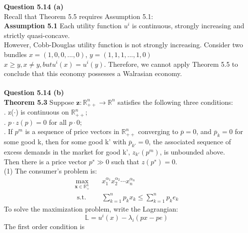 \documentclass[letterpaper,12pt]{article}
\theoremstyle{definition}
\begin{document}
\vspace{5mm}

\noindent\textbf{Question 5.14 (a)}\\
Recall that Theorem 5.5 requires Assumption 5.1:\\
\noindent\textbf{Assumption 5.1} Each utility function $u^i$ is continuous, strongly increasing and strictly quasi-concave.\\
However, Cobb-Douglas utility function is not strongly increasing. Consider two bundles $x = (1, 0, 0, ..., 0)$, $y = (1, 1, 1, ..., 1, 0)$ $x \geq y, x \neq y, but u^i(x) = u^i(y)$. Therefore, we cannot apply Theorem 5.5 to conclude that this economy possesses a Walrasian economy.\\
\\
\noindent\textbf{Question 5.14 (b)}\\
\noindent\textbf{Theorem 5.3} Suppose $\mathbf { z } : \mathbb { R } _ { + + } ^ { n } \rightarrow \mathbb { R } ^ { n }$ satisfies the following three conditions:\\
. z($\cdot$) is continuous on $\mathbb{R}_{++}^{n}$;\\
. $p \cdot z(p) = 0$ for all $p \cdot 0$;\\
. If ${p^m}$ is a sequence of price vectors in $\mathbb{R}_{++}^{n}$ converging to $\overline{p} = 0$, and $\overline{p}_k = 0$ for some good k, then for some good k'  with $\overline{p}_{k'} = 0$, the associated sequence of
excess demands in the market for good k', ${z_{k'}(p^m)}$, is unbounded above. \\
Then there is a price vector $p^∗ \gg 0$ such that $z(p^∗) = 0$.\\
(1) The consumer's problem is:\\
\begin{equation}
    \begin{aligned}
    \max _ { \mathbf { x } \in \mathbb { R } _ { + } ^ { n } } \quad & x _ { 1 } ^ { \alpha _ { 1 } } x _ { 2 } ^ { \alpha _ { 2 } } \cdots x _ { n } ^ { \alpha _ { n } } \quad \\
    \text { s.t. } \quad &\sum _ { k = 1 } ^ { n } p _ { k } x _ { k } \leq \sum _ { k = 1 } ^ { n } p _ { k } e _ { k }
    \end{aligned}
\end{equation}
To solve the maximization problem, write the Lagrangian:\\
$$\mathbb{L} = u^i(x) - \lambda_i (px - pe)$$
The first order condition is \\
\end{document}
